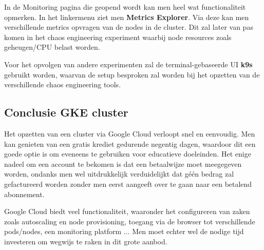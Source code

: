 In de Monitoring pagina die geopend wordt kan men heel wat functionaliteit opmerken. In het linkermenu ziet men {\bf Metrics Explorer}. Via deze kan men verschillende metrics opvragen van de nodes in de cluster. Dit zal later van pas komen in het chaos engineering experiment waarbij node resources zoals geheugen/CPU belast worden.

Voor het opvolgen van andere experimenten zal de terminal-gebaseerde UI {\bf k9s} gebruikt worden, waarvan de setup besproken zal worden bij het opzetten van de verschillende chaos engineering tools. 
  
\subsection{Conclusie GKE cluster}

Het opzetten van een cluster via Google Cloud verloopt snel en eenvoudig. Men kan genieten van een gratis krediet gedurende negentig dagen, waardoor dit een goede optie is om eveneens te gebruiken voor educatieve doeleinden. Het enige nadeel om een account te bekomen is dat een betaalwijze moet meegegeven worden, ondanks men wel uitdrukkelijk verduidelijkt dat géén bedrag zal gefactureerd worden zonder men eerst aangeeft over te gaan naar een betalend abonnement. 

Google Cloud biedt veel functionaliteit, waaronder het configureren van zaken zoals autoscaling en node provisioning, toegang via de browser tot verschillende pods/nodes, een monitoring platform ... Men moet echter wel de nodige tijd investeren om wegwijs te raken in dit grote aanbod.  